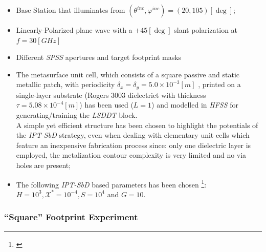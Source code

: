 \begin{itemize}
\item Base Station that illuminates from $(\theta^{inc},\varphi^{inc})=(20,105)[\deg]$;
\item Linearly-Polarized plane wave with a $+45[\deg]$ slant polarization
at $f=30[GHz]$
\item Different \emph{SPSS} apertures and target footprint masks
\item The metasurface unit cell, which consists of a square passive and
static metallic patch, with periodicity $\delta_{x}=\delta_{y}=5.0\times10^{-3}[m]$
, printed on a single-layer substrate (Rogers 3003 dielectrict with
thickness $\tau=5.08\times10^{-4}[m]$) has been used ($L=1$) and
modelled in \emph{HFSS} for generating/training the \emph{LSDDT} block.\\
A simple yet efficient structure has been chosen to highlight the
potentials of the \emph{IPT-SbD} strategy, even when dealing with
elementary unit cells which feature an inexpensive fabrication process
since: only one dielectric layer is employed, the metalization contour
complexity is very limited and no via holes are present;
\item The following \emph{IPT-SbD} based parameters has been chosen %
\footnote{\cite{Yang:2021}%
}{\let\thefootnote\relax{}}:
$H=10^{3},\mathcal{X}^{*}=10^{-4},S=10^{4}$ and $G=10$.
\end{itemize}

\subsubsection{{}``Square'' Footprint Experiment}

